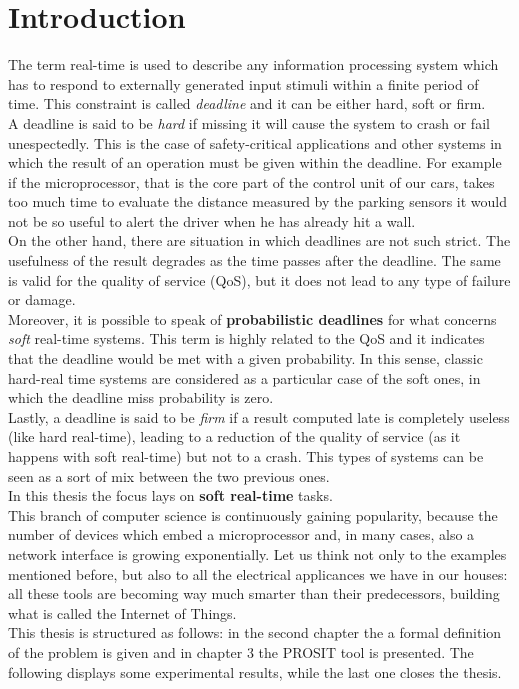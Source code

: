 \chapter{Introduction}\label{chp:introduction}


The term real-time is used to describe any information processing system which has to respond to externally generated input stimuli within a finite period of time. This constraint is called \emph{deadline} and it can be either hard, soft or firm.\\
A deadline is said to be \emph{hard} if missing it will cause the system to crash or fail unespectedly. This is the case of safety-critical applications and other systems in which the result of an operation must be given within the deadline. For example if the microprocessor, that is the core part of the control unit of our cars, takes too much time to evaluate the distance measured by the parking sensors it would not be so useful to alert the driver when he has already hit a wall.\\
On the other hand, there are situation in which deadlines are not such strict. The usefulness of the result degrades as the time passes after the deadline. The same is valid for the quality of service (QoS), but it does not lead to any type of failure or damage.\\
Moreover, it is possible to speak of \textbf{probabilistic deadlines} for what concerns \emph{soft} real-time systems. This term is highly related to the QoS and it indicates that the deadline would be met with a given probability. In this sense, classic hard-real time systems are considered as a particular case of the soft ones, in which the deadline miss probability is zero.\\ 
Lastly, a deadline is said to be \emph{firm} if a result computed late is completely useless (like hard real-time), leading to a reduction of the quality of service (as it happens with soft real-time) but not to a crash. This types of systems can be seen as a sort of mix between the two previous ones.\\
In this thesis the focus lays on \textbf{soft real-time} tasks.\\
This branch of computer science is continuously gaining popularity, because the number of devices which embed a microprocessor and, in many cases, also a network interface is growing exponentially. Let us think not only to the examples mentioned before, but also to all the electrical applicances we have in our houses: all these tools are becoming way much smarter than their predecessors, building what is called the Internet of Things.\\
This thesis is structured as follows: in the second chapter the a formal definition of the problem is given and in chapter 3 the PROSIT tool is presented. The following displays some experimental results, while the last one closes the thesis.      